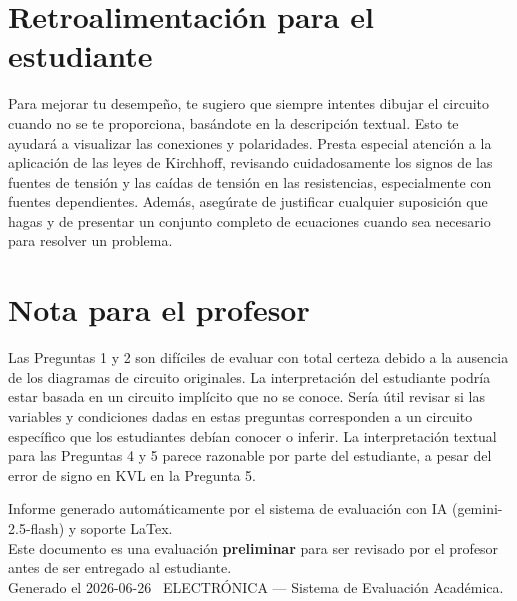 \documentclass[11pt,a4paper]{article}
\begin{document}
\section*{Retroalimentación para el estudiante}
\begin{tcolorbox}[cajaRecomendacion, title={Dirigido a: Sebastian Pulido}]
Para mejorar tu desempeño, te sugiero que siempre intentes dibujar el circuito cuando no se te proporciona, basándote en la descripción textual. Esto te ayudará a visualizar las conexiones y polaridades. Presta especial atención a la aplicación de las leyes de Kirchhoff, revisando cuidadosamente los signos de las fuentes de tensión y las caídas de tensión en las resistencias, especialmente con fuentes dependientes. Además, asegúrate de justificar cualquier suposición que hagas y de presentar un conjunto completo de ecuaciones cuando sea necesario para resolver un problema.
\end{tcolorbox}

\section*{Nota para el profesor}
\begin{tcolorbox}[
  enhanced, breakable,
  colback=yellow!8, colframe=yellow!60!black,
  fonttitle=\bfseries, coltitle=black,
  title={Observaciones para revisión manual},
  top=4pt, bottom=4pt, left=8pt, right=8pt,
]
Las Preguntas 1 y 2 son difíciles de evaluar con total certeza debido a la ausencia de los diagramas de circuito originales. La interpretación del estudiante podría estar basada en un circuito implícito que no se conoce. Sería útil revisar si las variables y condiciones dadas en estas preguntas corresponden a un circuito específico que los estudiantes debían conocer o inferir. La interpretación textual para las Preguntas 4 y 5 parece razonable por parte del estudiante, a pesar del error de signo en KVL en la Pregunta 5.
\end{tcolorbox}

\vspace{12pt}
\begin{center}
  \footnotesize\color{gray}
  Informe generado automáticamente por el sistema de evaluación con IA (gemini-2.5-flash) y soporte LaTex. \\
  Este documento es una evaluación \textbf{preliminar} para ser revisado por el profesor antes de ser entregado al 
  estudiante. \\
  Generado el 2026-06-26 \textbullet\ ELECTRÓNICA --- Sistema de Evaluación Académica.
  \end{center}
\end{document}
